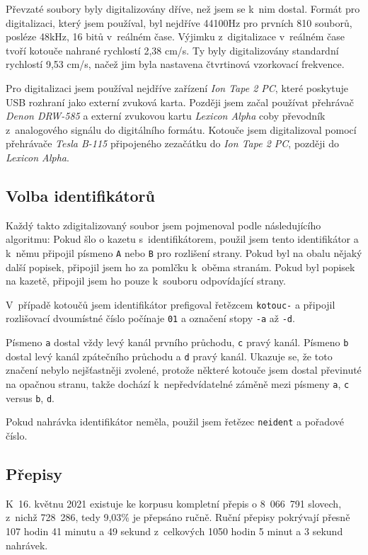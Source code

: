 Převzaté soubory byly digitalizovány dříve, než jsem se k~nim dostal. Formát pro digitalizaci, který jsem používal, byl
nejdříve 44100Hz pro prvních 810 souborů, posléze 48kHz,
16 bitů v~reálném čase. Výjimku z~digitalizace v~reálném čase tvoří
kotouče nahrané rychlostí 2,38 cm/s. Ty byly digitalizovány standardní
rychlostí 9,53 cm/s, načež jim byla nastavena čtvrtinová vzorkovací
frekvence.

Pro digitalizaci jsem používal nejdříve zařízení {\em Ion Tape 2 PC}, které
poskytuje USB rozhraní jako externí zvuková karta. Později jsem začal používat
přehrávač {\em Denon DRW-585} a externí zvukovou kartu {\em Lexicon Alpha} coby převodník
z~analogového signálu do digitálního formátu. Kotouče jsem digitalizoval pomocí
přehrávače {\em Tesla B-115} připojeného zezačátku do {\em Ion Tape 2 PC},
později do {\em Lexicon Alpha}.

\subsection{Volba identifikátorů}

Každý takto zdigitalizovaný soubor jsem pojmenoval podle následujícího
algoritmu: Pokud šlo o kazetu s~identifikátorem, použil jsem tento identifikátor
a k~němu připojil písmeno \texttt{A} nebo \texttt{B} pro rozlišení strany. Pokud
byl na obalu nějaký další popisek, připojil jsem ho za pomlčku k~oběma stranám.
Pokud byl popisek na kazetě, připojil jsem ho pouze k~souboru odpovídající strany.

V~případě
kotoučů jsem identifikátor prefigoval řetězcem \texttt{kotouc-} a připojil
rozlišovací dvoumístné číslo počínaje \texttt{01} a označení stopy \texttt{-a}
až \texttt{-d}.

Písmeno \texttt{a} dostal vždy levý kanál prvního průchodu, \texttt{c} pravý
kanál. Písmeno \texttt{b} dostal levý kanál zpátečního průchodu a \texttt{d}
pravý kanál. Ukazuje se, že toto značení nebylo nejšťastněji zvolené, protože
některé kotouče jsem dostal převinuté na opačnou stranu, takže dochází
k~nepředvídatelné záměně mezi písmeny \texttt{a}, \texttt{c} versus \texttt{b},
\texttt{d}.

Pokud nahrávka identifikátor neměla, použil jsem řetězec \texttt{neident} a
pořadové číslo.

\subsection{Přepisy}

K~16. květnu 2021 existuje ke korpusu kompletní přepis o 8~066~791
slovech, z~nichž 728~286, tedy 9,03\% je přepsáno ručně.
Ruční přepisy pokrývají přesně %
107 hodin 41 minutu a 49 sekund z~celkových
1050 hodin 5 minut a 3 sekund nahrávek.

